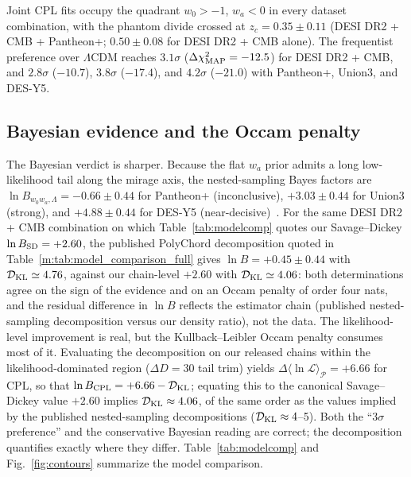 \documentclass[aps,prd,preprint,superscriptaddress,nofootinbib]{revtex4-2}
\begin{document}
Joint CPL fits occupy the quadrant $w_0 > -1$, $w_a < 0$ in every dataset combination, with the phantom divide crossed at $z_c = 0.35 \pm 0.11$ (DESI DR2 + CMB + Pantheon+; $0.50 \pm 0.08$ for DESI DR2 + CMB alone). The frequentist preference over $\Lambda$CDM reaches $3.1\sigma$ ($\Delta\chi^2_{\rm MAP} = -12.5$) for DESI DR2 + CMB, and $2.8\sigma$ ($-10.7$), $3.8\sigma$ ($-17.4$), and $4.2\sigma$ ($-21.0$) with Pantheon+, Union3, and DES-Y5.

\subsection{Bayesian evidence and the Occam penalty}

The Bayesian verdict is sharper. Because the flat $w_a$ prior admits a long low-likelihood tail along the mirage axis, the nested-sampling Bayes factors are $\ln B_{w_0w_a,\Lambda} = -0.66 \pm 0.44$ for Pantheon+ (inconclusive), $+3.03 \pm 0.44$ for Union3 (strong), and $+4.88 \pm 0.44$ for DES-Y5 (near-decisive)~\cite{Lodha2025}. For the same DESI DR2 + CMB combination on which Table~\ref{tab:modelcomp} quotes our Savage--Dickey $\ln B_{\rm SD} = +2.60$, the published PolyChord decomposition quoted in Table~\ref{m:tab:model_comparison_full} gives $\ln B = +0.45 \pm 0.44$ with $\mathcal{D}_{\rm KL} \simeq 4.76$, against our chain-level $+2.60$ with $\mathcal{D}_{\rm KL} \simeq 4.06$: both determinations agree on the sign of the evidence and on an Occam penalty of order four nats, and the residual difference in $\ln B$ reflects the estimator chain (published nested-sampling decomposition versus our density ratio), not the data. The likelihood-level improvement is real, but the Kullback--Leibler Occam penalty consumes most of it. Evaluating the decomposition on our released chains within the likelihood-dominated region ($\Delta D = 30$ tail trim) yields $\Delta\langle\ln\mathcal{L}\rangle_{\mathcal{P}} = +6.66$ for CPL, so that $\ln B_{\rm CPL} = +6.66 - \mathcal{D}_{\rm KL}$; equating this to the canonical Savage--Dickey value $+2.60$ implies $\mathcal{D}_{\rm KL} \approx 4.06$, of the same order as the values implied by the published nested-sampling decompositions ($\mathcal{D}_{\rm KL} \approx 4$--5). Both the ``$3\sigma$ preference'' and the conservative Bayesian reading are correct; the decomposition quantifies exactly where they differ. Table~\ref{tab:modelcomp} and Fig.~\ref{fig:contours} summarize the model comparison.
\end{document}
